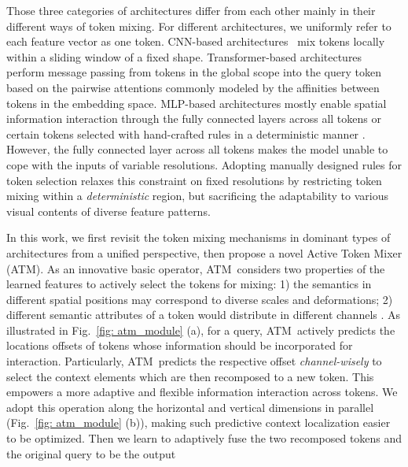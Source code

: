 \documentclass[letterpaper]{article} \usepackage{aaai23v}  \usepackage{times}  \usepackage{helvet}  \usepackage{courier}  \usepackage[hyphens]{url}  \usepackage{graphicx} \urlstyle{rm} \def\UrlFont{\rm}  \usepackage{caption} \frenchspacing  \setlength{\pdfpagewidth}{8.5in}  \setlength{\pdfpageheight}{11in}  \usepackage{algorithm}
\newcommand{\ourop}{{ATM}}
\begin{document}
Those three categories of architectures differ from each other mainly in their different ways of token mixing. For different architectures, we uniformly refer to each feature vector as one token.
CNN-based architectures~\cite{simonyan2014veryVGG,he2016deepresnet,huang2017DenseNet} mix tokens locally within a sliding window of a fixed shape. Transformer-based architectures \cite{alexander2021vit,touvron2021deit,wang2021pyramidpvt} perform message passing from tokens in the global scope into the query token based on the pairwise attentions commonly modeled by the affinities between tokens in the embedding space. MLP-based architectures mostly enable spatial information interaction through the fully connected layers across all tokens \cite{tolstikhin2021mlpmixer,touvron2021resmlp,hou2021visionvip,tang2021sparsesMLP} or certain tokens selected with hand-crafted rules in a deterministic manner \cite{chen2022cyclemlp,zhang2021morphmlp,wang2022shift,yu2022s2MLP,lian2021asmlp,tang2021imagewavemlp}. However, the fully connected layer across all tokens makes the model unable to cope with the inputs of variable resolutions.
Adopting manually designed rules for token selection 
relaxes this constraint on fixed resolutions by restricting token mixing within a \textit{deterministic} region, but sacrificing the adaptability to various visual contents of diverse feature patterns.


In this work, we first revisit the token mixing mechanisms in dominant types of architectures from a unified perspective, then propose a novel Active Token Mixer (\ourop). 
As an innovative basic operator, \ourop~considers two properties of the learned features to actively select the tokens for mixing: 
1) the semantics in different spatial positions may correspond to diverse scales and deformations; 
2) different semantic attributes of a token would distribute in different channels \cite{bau2020understanding,wu2021stylespace}.
As illustrated in Fig.~\ref{fig: atm_module} (a), for a query, \ourop~actively predicts the locations offsets of tokens whose information should be incorporated for interaction.
Particularly, \ourop~predicts the respective offset \emph{channel-wisely} to select the context elements which are then recomposed to a new token. This empowers a more adaptive and flexible information interaction across tokens.
We adopt this operation along the horizontal and vertical dimensions in parallel (Fig.~\ref{fig: atm_module} (b)), 
making such predictive context localization easier to be optimized. Then we learn to adaptively fuse the two recomposed tokens and the original query to be the output
\end{document}
